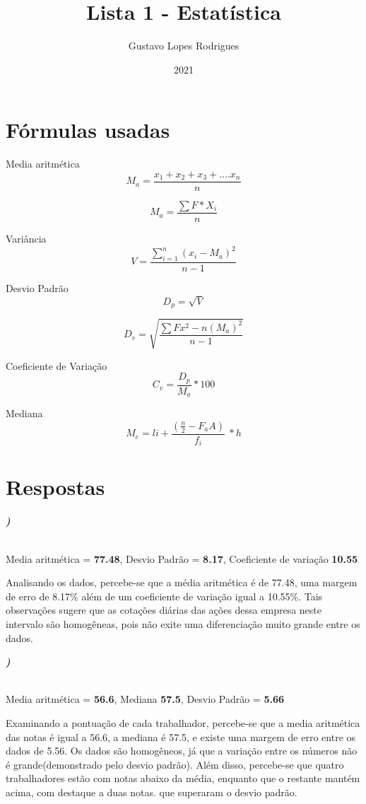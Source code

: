\documentclass[12pt]{article}
\title{\textbf{Lista 1 - Estatística}}
\author{Gustavo Lopes Rodrigues}
\date{2021}
\newcounter{instn}
\newcommand{\instnum}{\arabic{instn}}
\newcommand{\myline}[1]{
    \emph{\textbf{#1)}}
    \addtocounter{instn}{1}
}
\begin{document}
    
    \maketitle

    \section*{Fórmulas usadas}

    Media aritmética \[ M_a = \frac{x_1 + x_2 + x_3 + .... x_n }{n} \]

    \[ M_a = \frac{\sum F * X_i}{n}\]

    Variância \[ V = \frac{\sum_{i=1}^{n} (x_i - M_a)^2}{n-1}\]

    Desvio Padrão \[ D_p = \sqrt{V}\]

    \[ D_v = \sqrt{\frac{\sum Fx^2 - n(M_a)^2}{n-1}}\]

    Coeficiente de Variação \[ C_v = \frac{D_p}{M_a} * 100\]

    Mediana \[M_e = li + \frac{(\frac{n}{2} - F_aA)}{f_i}\ * h\]

    \newpage

    \section*{Respostas}

    \myline{\instnum} \\ Media aritmética = \textbf{77.48}, Desvio Padrão = \textbf{8.17}, Coeficiente de variação \textbf{10.55}


    Analisando os dados, percebe-se que a média aritmética é de 77.48, uma margem de erro de 8.17\% além 
    de um coeficiente de variação igual a 10.55\%. Tais observações sugere que 
    as cotações diárias das ações dessa empresa neste intervalo são homogêneas, pois não exite 
    uma diferenciação muito grande entre os dados.

    \myline{\instnum} \\ Media aritmética = \textbf{56.6}, Mediana \textbf{57.5}, Desvio Padrão = \textbf{5.66}


    Examinando a pontuação de cada trabalhador, percebe-se que a media aritmética das notas é igual a 
    56.6, a mediana é 57.5, e existe uma margem de erro entre os dados de 5.56. Os dados são homogêneos,
    já que a variação entre os números não é grande(demonstrado pelo desvio padrão). Além disso, percebe-se que quatro 
    trabalhadores estão com notas abaixo da média, enquanto que o restante mantém acima, com destaque a duas notas. que superaram
    o desvio padrão. 
\end{document}
